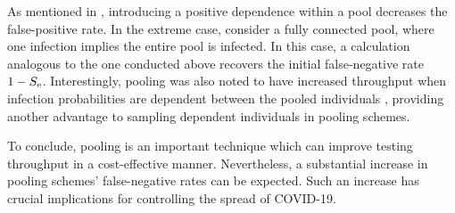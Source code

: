 \documentclass{article}
\begin{document}
As mentioned in \cite{DorfmanYuvalDor}, introducing a positive
dependence within a pool decreases the false-positive rate. In the
extreme case, consider a fully connected pool, where one infection
implies the entire pool is infected. In this case, a calculation
analogous to the one conducted above recovers the initial
false-negative rate $1-S_\text{e}$. Interestingly, pooling was also noted to
have increased throughput when infection probabilities are dependent
between the pooled individuals \cite{DorfmanYuvalDor}, providing
another advantage to sampling dependent individuals in pooling
schemes.

To conclude, pooling is an important technique which can improve
testing throughput in a cost-effective manner. Nevertheless, a
substantial increase in pooling schemes' false-negative rates can be
expected. Such an increase has crucial implications for controlling
the spread of COVID-19.





%

\end{document}
